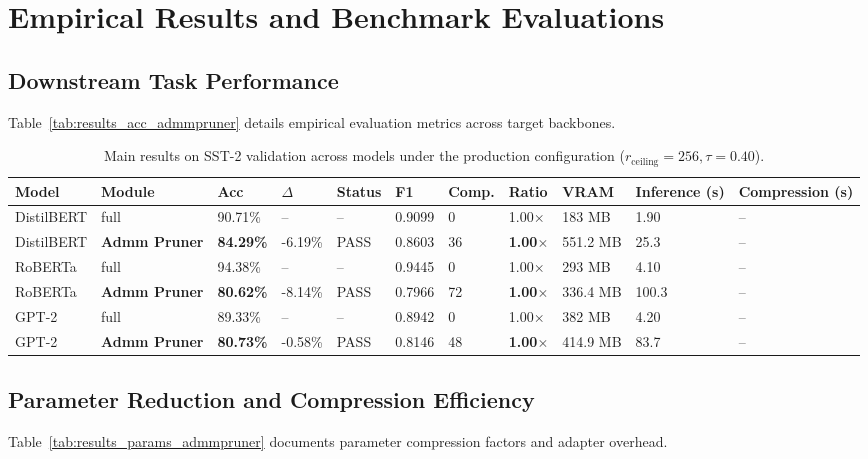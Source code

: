 \section{Empirical Results and Benchmark Evaluations}

\subsection{Downstream Task Performance}
Table~\ref{tab:results_acc_admmpruner} details empirical evaluation metrics across target backbones.

\begin{table}[t]
\centering
\small
\begin{tabular}{lllllllllll}
\toprule
\textbf{Model} & \textbf{Module} & \textbf{Acc} & \textbf{$\Delta$} & \textbf{Status} & \textbf{F1} & \textbf{Comp.} & \textbf{Ratio} & \textbf{VRAM} & \textbf{Inference (s)} & \textbf{Compression (s)} \\
\midrule
DistilBERT & full & 90.71\% & -- & -- & 0.9099 & 0 & 1.00$\times$ & 183 MB & 1.90 & -- \\
DistilBERT & \textbf{Admm Pruner} & \textbf{84.29\%} & -6.19\% & PASS & 0.8603 & 36 & \textbf{1.00$\times$} & 551.2 MB & 25.3 & -- \\
RoBERTa & full & 94.38\% & -- & -- & 0.9445 & 0 & 1.00$\times$ & 293 MB & 4.10 & -- \\
RoBERTa & \textbf{Admm Pruner} & \textbf{80.62\%} & -8.14\% & PASS & 0.7966 & 72 & \textbf{1.00$\times$} & 336.4 MB & 100.3 & -- \\
GPT-2 & full & 89.33\% & -- & -- & 0.8942 & 0 & 1.00$\times$ & 382 MB & 4.20 & -- \\
GPT-2 & \textbf{Admm Pruner} & \textbf{80.73\%} & -0.58\% & PASS & 0.8146 & 48 & \textbf{1.00$\times$} & 414.9 MB & 83.7 & -- \\
\bottomrule
\end{tabular}
\caption{Main results on SST-2 validation across models under the production configuration ($r_{\mathrm{ceiling}}=256, \tau=0.40$).}
\label{tab:main_sst2}
\end{table}

\subsection{Parameter Reduction and Compression Efficiency}
Table~\ref{tab:results_params_admmpruner} documents parameter compression factors and adapter overhead.

